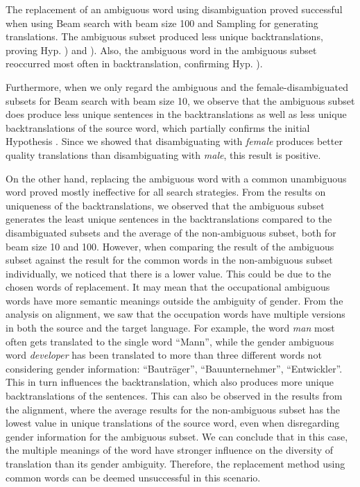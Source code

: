 The replacement of an ambiguous word using disambiguation proved successful when using Beam search with beam size 100 and Sampling for generating translations. The ambiguous subset produced less unique backtranslations, proving Hyp. ) and ). Also, the ambiguous word in the ambiguous subset reoccurred most often in backtranslation, confirming Hyp. ).

Furthermore, when we only regard the ambiguous and the female-disambiguated subsets for Beam search 
with beam size 10, we observe that the ambiguous subset does produce less unique sentences in the backtranslations as well as less unique backtranslations of the source word, which partially confirms the initial Hypothesis . Since we showed that disambiguating with \textit{female} produces better quality translations than disambiguating with \textit{male}, this result is positive.

On the other hand, replacing the ambiguous word with a common unambiguous word proved mostly ineffective for all search strategies. From the results on uniqueness of the backtranslations, we observed that the ambiguous subset generates the least unique sentences in the backtranslations compared to the disambiguated subsets and the average of the non-ambiguous subset, both for beam size 10 and 100. However, when comparing the result of the ambiguous subset against the result for the common words in the non-ambiguous subset individually, we noticed that there is a lower value. This could be due to the chosen words of replacement. It may mean that the occupational ambiguous words have more semantic meanings outside the ambiguity of gender. From the analysis on alignment, we saw that the occupation words have multiple versions in both the source and the target language. For example, the word \textit{man} most often gets translated to the single word “Mann”, while the gender ambiguous word \textit{developer} has been translated to more than three different words not considering gender information: “Bauträger”, “Bauunternehmer”, “Entwickler”. This in turn influences the backtranslation, which also produces more unique backtranslations of the sentences. This can also be observed in the results from the alignment, where the average results for the non-ambiguous subset has the lowest value in unique translations of the source word, even when disregarding gender information for the ambiguous subset. We can conclude that in this case, the multiple meanings of the word have stronger influence on the diversity of translation than its gender ambiguity. Therefore, the replacement method using common words can be deemed unsuccessful in this scenario.

